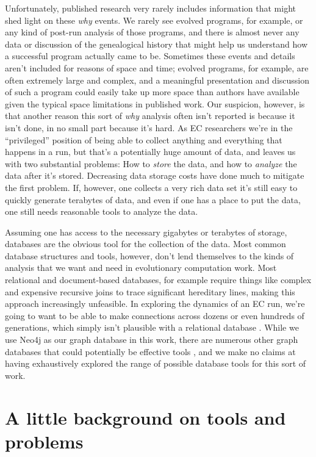 Unfortunately, published research very rarely includes information that might shed light on 
these \emph{why} events. We rarely see evolved programs, for example, or any kind of post-run analysis
of those programs, and there is almost never any data or discussion of the genealogical history that
might help us understand how a successful program actually came to be. 
Sometimes these events and details aren't included
for reasons of space and time; evolved programs, for example, are often extremely large and complex,
and a meaningful presentation and discussion of such a program could easily take up more space than
authors have available given the typical space limitations in published work.
Our suspicion, however, is that another reason this sort of \emph{why} analysis often isn't 
reported is because it isn't done, in no small part because it's hard. As EC researchers we're in the
``privileged'' position of being able to collect anything and everything that happens in a run, 
but that's a potentially huge amount of data, and leaves us with two substantial problems: 
How to \emph{store} the data, and how to \emph{analyze} the data
after it's stored. 
Decreasing data storage costs have done much to mitigate the first problem.
If, however, one collects a very rich data set it's still easy to quickly generate terabytes of data,
and even if one has a place to put the data, one still needs reasonable tools to analyze the data.

Assuming one has access to the necessary gigabytes or terabytes of storage, 
databases are the obvious tool for the collection of the data. Most common database structures and tools,
however,
don't lend themselves to the kinds of analysis that we want and need in evolutionary computation work. 
Most relational and document-based databases, for example require things like complex and expensive 
recursive joins to trace significant hereditary lines, making this approach increasingly unfeasible.
In exploring the dynamics of an EC run, we're going to want to be able to
make connections across dozens or even hundreds of generations, which simply isn't plausible with a
relational database \citep{Robinson:GraphDB:Book}. 
While we use Neo4j as our graph database in this work, there are 
numerous other 
graph databases that could potentially be effective tools \citep{wiki:GraphDB}, and we make no claims at having
exhaustively explored the range of possible database tools for this sort of work.

\section{A little background on tools and problems}


